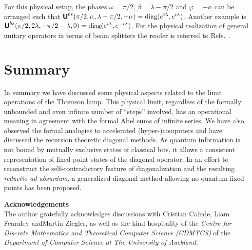\documentclass{llncs}
\begin{document}
For this physical setup, the phases
$\omega =\pi /2$,
$\beta = \lambda -\pi /2$
and $\varphi =-\alpha$
can be arranged such that
${\textsf{\textbf{U}}}^{bs} (\pi /2,\alpha , \lambda -\pi /2 ,-\alpha )= \mbox{diag}( e^{i\lambda } , e^{i\lambda })$.
Another example is
${\textsf{\textbf{U}}}^{bs} (\pi /2,2\lambda , -\pi /2 -\lambda ,0)= \mbox{diag}( e^{i\lambda } , e^{-i\lambda })$.
For the physical realization of general unitary operators in terms of beam splitters
the reader is referred to Refs.~\cite{rzbb,reck-94,zukowski-97,svozil-2004-analog}.

\section{Summary}

In summary we have discussed some physical aspects related to the limit operations of the Thomson lamp.
This physical limit, regardless of the formally unbounded and even infinite number of ``steps'' involved,
has an operational meaning in agreement with the formal Abel sums of infinite series.
We have also observed the formal analogies to accelerated (hyper-)computers and have discussed the recursion theoretic diagonal methods.
As quantum information is not bound by mutually exclusive states of classical bits,
it allows a consistent representation of fixed point states of the diagonal operator.
In an effort to reconstruct the self-contradictory feature of diagonalization and the resulting {\it reductio ad absurdum},
a generalized diagonal method allowing no quantum fixed points has been proposed.


$\;$\\
{\bf Acknowledgements}
\\
The author gratefully acknowledges discussions with Cristian Calude,
Liam Fearnley andMartin Ziegler, as well as the kind hospitality of the {\it Centre for Discrete Mathematics
and Theoretical Computer Science (CDMTCS)} of the {\it Department of Computer Science at
The University of Auckland.}


%
%
\end{document}
